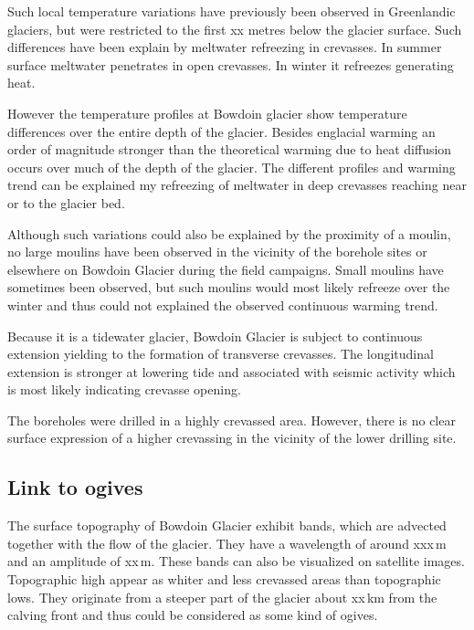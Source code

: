 \documentclass[utf8]{article}
\begin{document}
    Such local temperature variations have previously been observed in
    Greenlandic glaciers, but were restricted to the first xx metres below
    the glacier surface. Such differences have been explain by meltwater
    refreezing in crevasses. In summer surface meltwater penetrates in open
    crevasses. In winter it refreezes generating heat.

    However the temperature profiles at Bowdoin glacier show temperature
    differences over the entire depth of the glacier. Besides englacial warming
    an order of magnitude stronger than the theoretical warming due to heat
    diffusion occurs over much of the depth of the glacier. The different
    profiles and warming trend can be explained my refreezing of meltwater
    in deep crevasses reaching near or to the glacier bed.

    Although such variations could also be explained by the proximity of a
    moulin, no large moulins have been observed in the vicinity of the borehole
    sites or elsewhere on Bowdoin Glacier during the field campaigns. Small
    moulins have sometimes been observed, but such moulins would most likely
    refreeze over the winter and thus could not explained the observed
    continuous warming trend.

    Because it is a tidewater glacier, Bowdoin Glacier is subject to continuous
    extension yielding to the formation of transverse crevasses. The
    longitudinal extension is stronger at lowering tide and associated with
    seismic activity which is most likely indicating crevasse opening.

    The boreholes were drilled in a highly crevassed area. However, there is
    no clear surface expression of a higher crevassing in the vicinity of the
    lower drilling site.

\subsection{Link to ogives}

    The surface topography of Bowdoin Glacier exhibit bands, which are advected
    together with the flow of the glacier. They have a wavelength of around
    xxx\,m and an amplitude of xx\,m. These bands can also be visualized on
    satellite images. Topographic high appear as whiter and less crevassed
    areas than topographic lows. They originate from a steeper part of the
    glacier about xx\,km from the calving front and thus could be considered as
    some kind of ogives.
\end{document}
